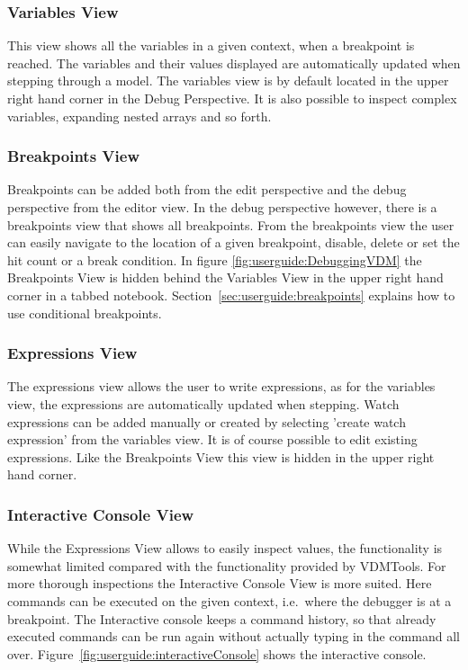 \subsubsection{Variables View} 
This view shows all the variables in a given context, when a breakpoint is
reached. The variables and their values displayed are automatically updated when
stepping through a model. The variables view is by default located in the upper
right hand corner in the Debug Perspective. It is also possible to inspect complex variables,
expanding nested arrays and so forth.

\subsubsection{Breakpoints View}
Breakpoints can be added both from the edit perspective and the debug perspective
from the editor view. In the debug perspective however, there is a breakpoints
view that shows all breakpoints. From the breakpoints view the user can easily
navigate to the location of a given breakpoint, disable, delete or set the hit
count or a break condition. In figure \ref{fig:userguide:DebuggingVDM} the
Breakpoints View is hidden behind the Variables View in the upper right hand 
corner in a tabbed notebook. Section~\ref{sec:userguide:breakpoints} explains
how to use conditional breakpoints.

\subsubsection{Expressions View}

The expressions view allows the user to write expressions, as for the
variables view, the expressions are automatically updated when stepping.
Watch expressions can be added manually or created by selecting 'create watch
expression' from the variables view. It is of course possible to edit existing
expressions. Like the Breakpoints View this view is hidden in the upper right
hand corner.

\subsubsection{Interactive Console View}

While the Expressions View allows to easily inspect values, the functionality is
somewhat limited compared with the functionality provided by VDMTools. For more
thorough inspections the Interactive Console View is more suited. Here commands
can be executed on the given context, i.e.\ where the debugger is at a
breakpoint. The Interactive console keeps a command history, so that already
executed commands can be run again without actually typing in the command all
over. Figure~\ref{fig:userguide:interactiveConsole} shows the interactive
console.


